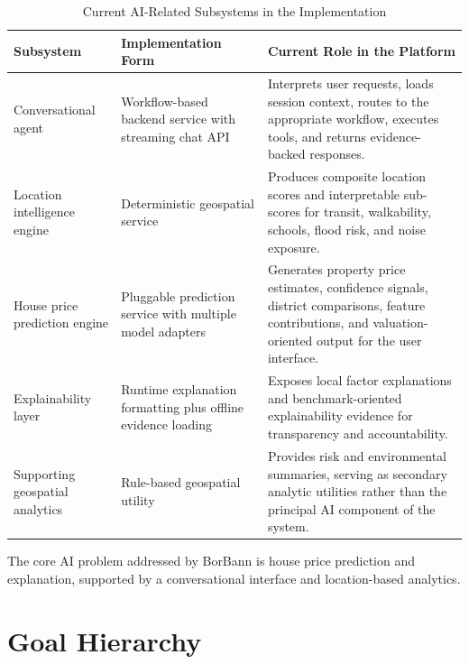\begin{table}[htbp]
    \centering
    \small
    \renewcommand{\arraystretch}{1.25}
    \begin{tabularx}{\textwidth}{>{\raggedright\arraybackslash}p{}>{\raggedright\arraybackslash}p{}>{\raggedright\arraybackslash}X}
        \toprule
        \rowcolor[gray]{0.9} \textbf{Subsystem} & \textbf{Implementation Form} & \textbf{Current Role in the Platform} \\
        \midrule
        Conversational agent & Workflow-based backend service with streaming chat API & Interprets user requests, loads session context, routes to the appropriate workflow, executes tools, and returns evidence-backed responses. \\
        Location intelligence engine & Deterministic geospatial service & Produces composite location scores and interpretable sub-scores for transit, walkability, schools, flood risk, and noise exposure. \\
        House price prediction engine & Pluggable prediction service with multiple model adapters & Generates property price estimates, confidence signals, district comparisons, feature contributions, and valuation-oriented output for the user interface. \\
        Explainability layer & Runtime explanation formatting plus offline evidence loading & Exposes local factor explanations and benchmark-oriented explainability evidence for transparency and accountability. \\
        Supporting geospatial analytics & Rule-based geospatial utility & Provides risk and environmental summaries, serving as secondary analytic utilities rather than the principal AI component of the system. \\
        \bottomrule
    \end{tabularx}
    \caption{Current AI-Related Subsystems in the Implementation}
    \label{tab:chapter5-ai-overview}
\end{table}

The core AI problem addressed by BorBann is house price prediction and explanation, supported by a conversational interface and location-based analytics.

\section{Goal Hierarchy}

